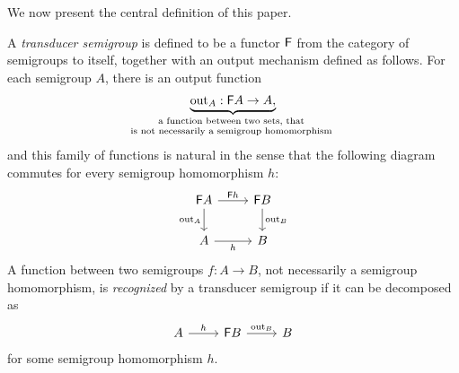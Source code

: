  
 
 We now present the central definition of this paper. 

\newcommand{\emptytester}{2}
\begin{definition}
    A \emph{transducer semigroup} is defined to be a functor $\mathsf F$ 
    from the category of semigroups to itself, together with an output mechanism defined as follows. For each semigroup $A$, there is an output function 
    \begin{align*}
    \myunderbrace{\outfun_A : \functor A \to A,}{a function between two sets, that \\ is not necessarily a semigroup homomorphism}
    \end{align*}
    and this family of functions is natural in the sense that the following diagram commutes for every semigroup homomorphism $h$: 
    \[
    \begin{tikzcd}
    \functor A 
    \ar[r,"\functor h"]
    \ar[d,"\outfun_A"']
    &
    \functor B
    \ar[d,"\outfun_B"]
    \\
    A
    \ar[r,"h"']
    &
    B
    \end{tikzcd}
    \]
    A function between two semigroups $f : A \to B$, not necessarily a semigroup homomorphism, is  \emph{recognized} by a transducer semigroup if it can be decomposed as 
    \[
        \begin{tikzcd}
        A 
        \ar[r,"h"]
        &
        \functor B
        \ar[r,"\outfun_B"]
        &
        B
        \end{tikzcd}
        \]
        for some  semigroup homomorphism $h$.
\end{definition}


